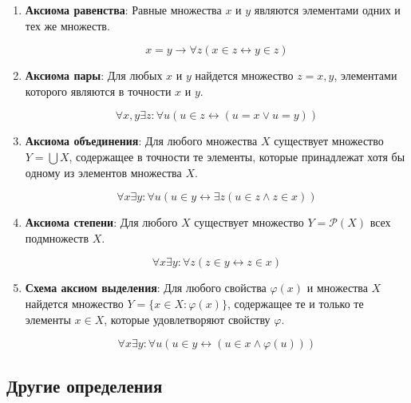 \begin{enumerate}

	\item{\textbf{Аксиома равенства}: Равные множества $x$ и $y$ являются элементами одних и тех же множеств.

		$$ x = y \rightarrow \forall z ( x \in z \leftrightarrow y \in z ) $$}

	\item{\textbf{Аксиома пары}: Для любых $x$ и $y$ найдется множество $ z = {x, y}$, элементами которого являются в
		точности $x$ и $y$.

		$$ \forall x, y \exists z : \forall u (u \in z \leftrightarrow ( u = x \lor u = y)) $$}

	\item{\textbf{Аксиома объединения}: Для любого множества $X$ существует множество $Y = \bigcup X$, содержащее в
		точности те элементы, которые принадлежат хотя бы одному из элементов множества $X$.

		$$ \forall x \exists y: \forall u ( u \in y \leftrightarrow \exists z (u \in z \land z \in x)) $$}

	\item{\textbf{Аксиома степени}: Для любого $X$ существует множество $ Y = \mathcal{P} (X)$ всех подмножеств $X$.

		$$ \forall x \exists y : \forall z ( z \in y \leftrightarrow z \in x) $$}

	\item{\textbf{Схема аксиом выделения}: Для любого свойства $\varphi (x)$ и множества $X$ найдется множество $Y = \{x
		\in X: \varphi (x)\}$, содержащее те и только те элементы $x \in X$, которые удовлетворяют свойству $\varphi$.

		$$ \forall x \exists y: \forall u ( u \in y \leftrightarrow (u \in x \land \varphi (u))) $$}

\end{enumerate}

\subsection{Другие определения}

